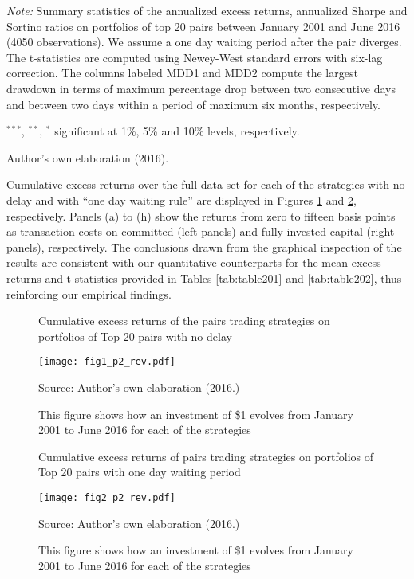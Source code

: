 \documentclass[a4paper,12pt]{report}
\begin{document}
\begin{threeparttable}[H]
\begin{tabularx}{\textwidth}{@{\extracolsep{\fill}}llllllll@{}}
		\bottomrule
	\end{tabularx}%
	\begin{tablenotes}
		\item \textit{Note:} \scriptsize  Summary statistics of the annualized excess returns, annualized Sharpe and Sortino ratios on portfolios of top 20 pairs between January 2001 and June 2016 (4050 observations). We assume a one day waiting period after the pair diverges. The t-statistics are computed using Newey-West standard errors with six-lag correction.  The columns labeled MDD1 and MDD2 compute the largest drawdown in terms of maximum percentage drop between two consecutive days and between two days within a period of maximum six months, respectively.
		\item \scriptsize $^{\ast\ast\ast}$, $^{\ast\ast}$, $^{\ast}$  significant at 1\%, 5\% and 10\% levels, respectively.
		\item Author's own elaboration (2016).
	\end{tablenotes}
	\label{tab:table202}%
\end{threeparttable}%

\vspace{0.6cm}

\medskip

Cumulative excess returns over the full data set for each of the strategies with no delay and with ``one day waiting rule'' are displayed in Figures \ref{fig:fig203}  and \ref{fig:fig204}, respectively. Panels (a) to (h) show the returns from zero to fifteen basis points as transaction costs on committed (left panels) and fully invested capital (right panels), respectively. The conclusions drawn from the graphical inspection of the results are consistent with our quantitative counterparts for the mean excess returns and t-statistics provided in Tables \ref{tab:table201} and \ref{tab:table202}, thus reinforcing our empirical findings.

\begin{figure}[H]
	\centering
	\caption{Cumulative excess returns of the pairs trading strategies on portfolios of Top 20 pairs with no delay}
	\texttt{[image: fig1\_p2\_rev.pdf]}
	\captionsetup{justification=raggedright,
		singlelinecheck=false
	}
	\caption*{Source: Author's own elaboration (2016.)}
	\caption*{This figure shows how an investment of \$1 evolves from January 2001 to June 2016 for each of the strategies}
	\label{fig:fig203}
\end{figure}

\begin{figure}[H]
	\centering
	\caption{Cumulative excess returns of pairs trading strategies on portfolios of Top 20 pairs with one day waiting period}
	\texttt{[image: fig2\_p2\_rev.pdf]}
	\captionsetup{justification=raggedright,
		singlelinecheck=false
	}
	\caption*{Source: Author's own elaboration (2016.)}
	\caption*{This figure shows how an investment of \$1 evolves from January 2001 to June 2016 for each of the strategies}
	\label{fig:fig204}
\end{figure}
\end{document}
